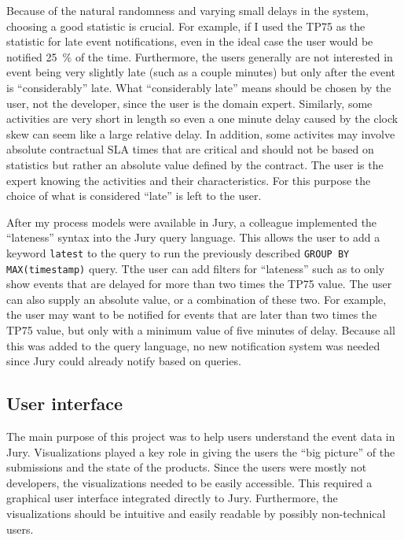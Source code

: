 Because of the natural randomness and varying small delays in the system, choosing a good statistic is crucial. 
For example, if I used the TP75 as the statistic for late event notifications, even in the ideal case the user would be notified 25~\% of the time.
Furthermore, the users generally are not interested in event being very slightly late (such as a couple minutes) but only after the event is ``considerably'' late.
What ``considerably late'' means should be chosen by the user, not the developer, since the user is the domain expert.
Similarly, some activities are very short in length so even a one minute delay caused by the clock skew can seem like a large relative delay.
In addition, some activites may involve absolute contractual SLA times that are critical and should not be based on statistics but rather an absolute value defined by the contract.
The user is the expert knowing the activities and their characteristics.
For this purpose the choice of what is considered ``late'' is left to the user.

After my process models were available in Jury, a colleague implemented the ``lateness'' syntax into the Jury query language. 
This allows the user to add a keyword \texttt{latest} to the query to run the previously described \texttt{GROUP BY MAX(timestamp)} query.
Tthe user can add filters for ``lateness'' such as to only show events that are delayed for more than two times the TP75 value.
The user can also supply an absolute value, or a combination of these two.
For example, the user may want to be notified for events that are later than two times the TP75 value, but only with a minimum value of five minutes of delay.
Because all this was added to the query language, no new notification system was needed since Jury could already notify based on queries.

\subsection{User interface}

The main purpose of this project was to help users understand the event data in Jury.
Visualizations played a key role in giving the users the ``big picture'' of the submissions and the state of the products.
Since the users were mostly not developers, the visualizations needed to be easily accessible.
This required a graphical user interface integrated directly to Jury.
Furthermore, the visualizations should be intuitive and easily readable by possibly non-technical users.


